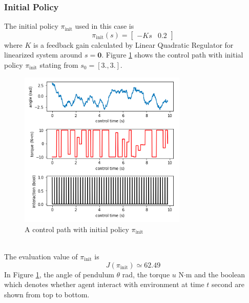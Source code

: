 \documentclass[english, dvipdfmx]{ampmt}             %
\begin{document}
\subsubsection{Initial Policy}
The initial policy $\pi_{\textrm{init}}$ used in this case is
\begin{equation}
	\pi_{\textrm{init}}(s) = \begin{bmatrix}-Ks&0.2\end{bmatrix}
\end{equation}
where $K$ is a feedback gain calculated by Linear Quadratic Regulator for linearized system around $s = \bm{0}$. Figure \ref{sample_02} shows the control path with initial policy $\pi_{\textrm{init}}$ stating from $s_0 = [3., 3.]$.
\begin{figure}[h]
	\centering
 	\includegraphics[width=8cm]{sample_02.png}
 	\caption{A control path with initial policy $\pi_{\textrm{init}}$} \label{sample_02}
\end{figure}\\
The evaluation value of $\pi_{\textrm{init}}$ is
\begin{equation}
	J(\pi_{\textrm{init}}) \simeq 62.49
\end{equation}
In Figure \ref{sample_02}, the angle of pendulum $\theta$ rad, the torque $u$ N$\cdot$m and the boolean which denotes whether agent interact with environment at time $t$ second are shown from top to bottom.
\end{document}
